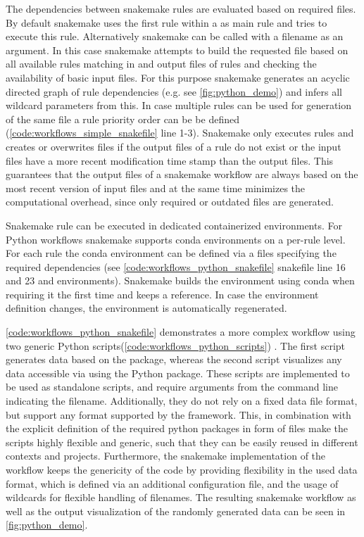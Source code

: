 The dependencies between snakemake rules are evaluated based on required files. By default snakemake uses the first rule within a  as main rule and tries to execute this rule. Alternatively snakemake can be called with a filename as an argument. In this case snakemake attempts to build the requested file based on all available rules matching in and output files of rules and checking the availability of basic input files. For this purpose snakemake generates an acyclic directed graph of rule dependencies (e.g. see \cref{fig:python_demo}) and infers all wildcard parameters from this. In case multiple rules can be used for generation of the same file a rule priority order can be be defined (\cref{code:workflows_simple_snakefile} line 1-3). Snakemake only executes rules and creates or overwrites files if the output files of a rule do not exist or the input files have a more recent modification time stamp than the output files. This guarantees that the output files of a snakemake workflow are always based on the most recent version of input files and at the same time minimizes the computational overhead, since only required or outdated files are generated.

Snakemake rule can be executed in dedicated containerized environments. For Python workflows snakemake supports conda environments on a per-rule level. For each rule the conda environment can be defined via a  files specifying the required dependencies (see \cref{code:workflows_python_snakefile} snakefile line 16 and 23 and environments). Snakemake builds the environment using conda when requiring it the first time and keeps a reference. In case the  environment definition changes, the environment is automatically regenerated.

\cref{code:workflows_python_snakefile} demonstrates a more complex workflow using two generic Python scripts(\cref{code:workflows_python_scripts}) . The first script generates data based on the  package, whereas the second script visualizes any data accessible via  using the Python  package. These scripts are implemented to be used as standalone scripts, and require arguments from the command line indicating the filename. Additionally, they do not rely on a fixed data file format, but support any format supported by the   framework. This, in combination with the explicit definition of the required python packages in form of  files make the scripts highly flexible and generic, such that they can be easily reused in different contexts and projects. Furthermore, the snakemake implementation of the workflow keeps the genericity of the code by providing flexibility in the used data format, which is defined via an additional configuration  file, and the usage of wildcards for flexible handling of filenames. The resulting snakemake workflow as well as the output visualization of the randomly generated data can be seen in \cref{fig:python_demo}.


